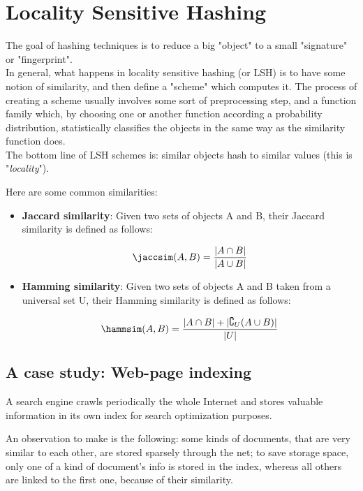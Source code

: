 \chapter{Locality Sensitive Hashing}
	
	The goal of hashing techniques is to reduce a big "object" to a small "signature" or "fingerprint".\\
	In general, what happens in locality sensitive hashing (or LSH) is to have some notion of similarity, and then define a "scheme" which computes it. The process of creating a scheme usually involves some sort of preprocessing step, and a function family which, by choosing one or another function according a probability distribution, statistically classifies the objects in the same way as the similarity function does.\\
	The bottom line of LSH schemes is: similar objects hash to similar values (this is "\textit{locality}").
	
	Here are some common similarities:
	\begin{itemize}
	
	\item \textbf{Jaccard similarity}: Given two sets of objects A and B, their Jaccard similarity is defined as follows:
	
	\begin{equation}
	\jaccsim(A, B) = \frac{|A\cap B|}{|A\cup B|}
	\end{equation}
	
	\item \textbf{Hamming similarity}: Given two sets of objects A and B taken from a universal set U, their Hamming similarity is defined as follows:
	
	\begin{equation}
	\hammsim(A, B) = \frac{|A\cap B| + |\complement_U(A\cup B)|}{|U|}
	\end{equation}
	
	\end{itemize}
	
\section{A case study: Web-page indexing}
	
	A search engine crawls periodically the whole Internet and stores valuable information in its own index for search optimization purposes.
	
	An observation to make is the following: some kinds of documents, that are very similar to each other, are stored sparsely through the net; to save storage space, only one of a kind of document's info is stored in the index, whereas all others are linked to the first one, because of their similarity.
	
